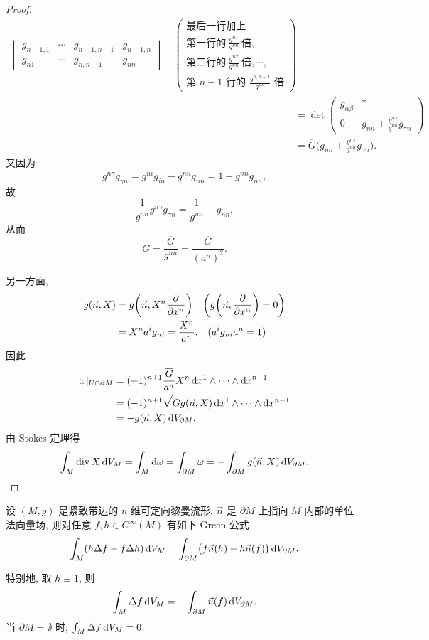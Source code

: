 \begin{proof}
\begin{align*}
\begin{vmatrix}
      g_{n-1,1} & \cdots & g_{n-1,n-1} & g_{n-1,n} \\
      g_{n1}    & \cdots & g_{n,n-1}   & g_{nn}
    \end{vmatrix}
    \quad\begin{pmatrix}
      \text{最后一行加上} \\
      \text{第一行的}\ \frac{g^{n1}}{g^{nn}}\ \text{倍}, \\
      \text{第二行的}\ \frac{g^{n2}}{g^{nn}}\ \text{倍},\cdots, \\
      \text{第\ }n-1\text{\ 行的\ }\frac{g^{n,n-1}}{g^{nn}}\text{\ 倍}
    \end{pmatrix} \\
    & = \det\begin{pmatrix}
      g_{\alpha\beta} & * \\
      0 & g_{nn}+\frac{g^{n\gamma}}{g^{nn}}g_{\gamma n}
    \end{pmatrix} \\
    & = \overline{G}\biggl(g_{nn} + \frac{g^{n\gamma}}{g^{nn}}g_{\gamma n}\biggr).
  \end{align*}
  又因为
  \[g^{n\gamma}g_{\gamma n} = g^{ni}g_{in} - g^{nn}g_{nn} = 1 - g^{nn}g_{nn},\]
  故
  \[\frac{1}{g^{nn}}g^{n\gamma}g_{\gamma n} = \frac{1}{g^{nn}} - g_{nn},\]
  从而
  \[G = \frac{\overline{G}}{g^{nn}} = \frac{\overline{G}}{(a^n)^2}.\]
 
  另一方面,
  \begin{align*}
    g(\vec{n},X)
    & = g\biggl(\vec{n},X^n\pdv{x^n}\biggr) \quad 
      \biggl(g\biggl(\vec{n},\pdv{x^{\alpha}}\biggr) = 0\biggr) \\
    & = X^n a^i g_{ni} = \frac{X^n}{a^n}.\quad (a^ig_{ni}a^n = 1)
  \end{align*}
  因此
  \begin{align*}
    \omega|_{U\cap\partial M}
    & = (-1)^{n+1} \frac{\overline{G}}{a^n} X^n\mathop{}\!\mathrm{d} x^1\wedge\cdots\wedge\mathop{}\!\mathrm{d} x^{n-1} \\
    & = (-1)^{n+1} \sqrt{\overline{G}} g(\vec{n},X) \mathop{}\!\mathrm{d} x^1\wedge\cdots\wedge\mathop{}\!\mathrm{d} x^{n-1} \\
    & = - g(\vec{n},X) \mathop{}\!\mathrm{d} V_{\partial M}.
  \end{align*}
  由 Stokes 定理得
  \[\int_{M} \operatorname{div} X\mathop{}\!\mathrm{d} V_M = \int_M \mathop{}\!\mathrm{d}\omega 
    = \int_{\partial M}\omega = -\int_{\partial M} g(\vec{n},X)\mathop{}\!\mathrm{d} V_{\partial M}.\qedhere\]
\end{proof}



\begin{corollary}
  设 $(M,g)$ 是紧致带边的 $n$ 维可定向黎曼流形, $\vec{n}$ 是 $\partial M$
  上指向 $M$ 内部的单位法向量场, 则对任意 $f,h\in C^{\infty}(M)$ 有如下 Green 公式
  \[\int_M (h\Delta f - f\Delta h)\mathop{}\!\mathrm{d} V_M 
    = \int_{\partial M} \bigl(f\vec{n}(h) - h\vec{n}(f)\bigr)\mathop{}\!\mathrm{d} V_{\partial M}.\]
  
  特别地, 取 $h\equiv 1$, 则
  \[\int_M \Delta f\mathop{}\!\mathrm{d} V_M = -\int_{\partial M} \vec{n}(f)\mathop{}\!\mathrm{d} V_{\partial M}.\]
  当 $\partial M=\emptyset$ 时, $\int_M \Delta f\mathop{}\!\mathrm{d} V_M = 0$.
\end{corollary}


